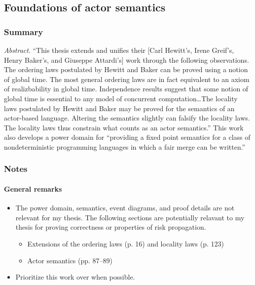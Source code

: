 

\subsection{Foundations of actor semantics}


\subsubsection*{Summary}
\emph{Abstract}. ``This thesis extends and unifies their [Carl Hewitt's, Irene Greif's, Henry Baker's, and Giuseppe Attardi's] work through the following observations. The ordering laws postulated by Hewitt and Baker can be proved using a notion of global time. The most general ordering laws are in fact equivalent to an axiom of realizbability in global time. Independence results suggest that some notion of global time is essential to any model of concurrent computation{\ldots}The locality laws postulated by Hewitt and Baker may be proved for the semantics of an actor-based language. Altering the semantics slightly can falsify the locality laws. The locality laws thus constrain what counts as an actor semantics.'' This work also develops a power domain for ``providing a fixed point semantics for a class of nondeterministic programming languages in which a fair merge can be written.''
\subsubsection*{Notes}
\paragraph{General remarks}
\begin{itemize}
\item The power domain, semantics, event diagrams, and proof details are not relevant for my thesis. The following sections are potentially relavant to my thesis for proving correctness or properties of risk propagation.
	\begin{itemize}
	\item Extensions of the ordering laws (p. 16) and locality laws (p. 123) \cite{Hewitt1977b}
	\item Actor semantics (pp. 87--89)
	\end{itemize}
\item Prioritize this work over \cite{Hewitt1977b} when possible.
\end{itemize}


